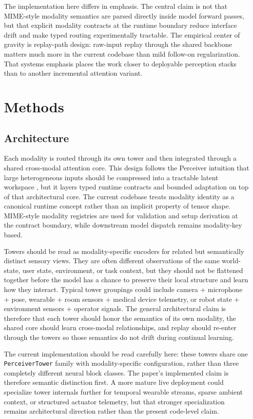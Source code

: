 \documentclass{article}
\begin{document}
The implementation here differs in emphasis. The central claim is not that MIME-style modality semantics are parsed directly inside model forward passes, but that explicit modality contracts at the runtime boundary reduce interface drift and make typed routing experimentally tractable. The empirical center of gravity is replay-path design: raw-input replay through the shared backbone matters much more in the current codebase than mild follow-on regularization. That systems emphasis places the work closer to deployable perception stacks than to another incremental attention variant.

\section{Methods}

\subsection{Architecture}

Each modality is routed through its own tower and then integrated through a shared cross-modal attention core. This design follows the Perceiver intuition that large heterogeneous inputs should be compressed into a tractable latent workspace \citep{cite2,cite3}, but it layers typed runtime contracts and bounded adaptation on top of that architectural core. The current codebase treats modality identity as a canonical runtime concept rather than an implicit property of tensor shape. MIME-style modality registries are used for validation and setup derivation at the contract boundary, while downstream model dispatch remains modality-key based.

Towers should be read as modality-specific encoders for related but semantically distinct sensory views. They are often different observations of the same world-state, user state, environment, or task context, but they should not be flattened together before the model has a chance to preserve their local structure and learn how they interact. Typical tower groupings could include camera + microphone + pose, wearable + room sensors + medical device telemetry, or robot state + environment sensors + operator signals. The general architectural claim is therefore that each tower should honor the semantics of its own modality, the shared core should learn cross-modal relationships, and replay should re-enter through the towers so those semantics do not drift during continual learning.

The current implementation should be read carefully here: these towers share one \texttt{PerceiverTower} family with modality-specific configuration, rather than three completely different neural block classes. The paper's implemented claim is therefore semantic distinction first. A more mature live deployment could specialize tower internals further for temporal wearable streams, sparse ambient context, or structured actuator telemetry, but that stronger specialization remains architectural direction rather than the present code-level claim.
\end{document}
